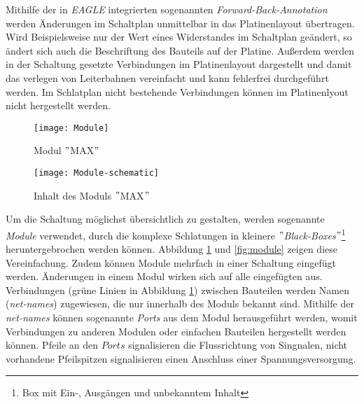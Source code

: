 Mithilfe der in \textit{EAGLE} integrierten sogenannten \textit{Forward-Back-Annotation} werden Änderungen im Schaltplan unmittelbar in das Platinenlayout übertragen. Wird Beispielsweise nur der Wert eines Widerstandes im Schaltplan geändert, so ändert sich auch die Beschriftung des Bauteils auf der Platine. Außerdem werden in der Schaltung gesetzte Verbindungen im Platinenlayout dargestellt und damit das verlegen von Leiterbahnen vereinfacht und kann fehlerfrei durchgeführt werden. Im Schlatplan nicht bestehende Verbindungen können im Platinenlyout nicht hergestellt werden.
\begin{figure}[h]
	\centering	\begin{minipage}{.35\linewidth}
		\centering
		\texttt{[image: Module]}
		\caption{Modul $"$MAX$"$}
		\label{fig:module}
	\end{minipage}
	\hfill
	\begin{minipage}{.6\linewidth}
		\centering
		\texttt{[image: Module-schematic]}
		\caption{Inhalt des Moduls $"$MAX$"$}
		\label{fig:module-schematic}
	\end{minipage}
\end{figure}
Um die Schaltung möglichst übersichtlich zu gestalten, werden sogenannte \textit{Module} verwendet, durch die komplexe Schlatungen in kleinere \textit{$"$Black-Boxes$"$}\footnote{Box mit Ein-, Ausgängen und unbekanntem Inhalt} heruntergebrochen werden können. Abbildung \ref{fig:module-schematic} und \ref{fig:module} zeigen diese Vereinfachung. Zudem können Module mehrfach in einer Schaltung eingefügt werden. Änderungen in einem Modul wirken sich auf alle eingefügten aus. Verbindungen (grüne Linien in Abbildung \ref{fig:module-schematic}) zwischen Bauteilen werden Namen (\textit{net-names}) zugewiesen, die nur innerhalb des Moduls bekannt sind. Mithilfe der \textit{net-names} können sogenannte \textit{Ports} aus dem Modul herausgeführt werden, womit Verbindungen zu anderen Modulen oder einfachen Bauteilen hergestellt werden können. Pfeile an den $Ports$ signalisieren die Flussrichtung von Singnalen, nicht vorhandene Pfeilspitzen signalisieren einen Anschluss einer Spannungsversorgung.\\